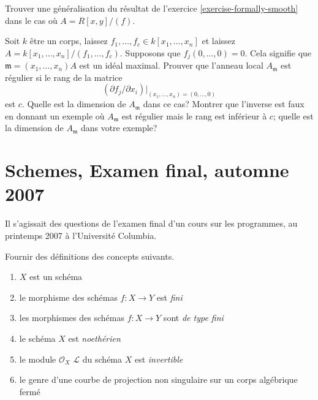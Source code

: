 \begin{exercise}
\label{exercise-formally-smooth-one-equation}
Trouver une généralisation du résultat de l'exercice \ref{exercise-formally-smooth} dans le cas
où $A = R[x, y]/(f)$.
\end{exercise}

\begin{exercise}
\label{exercise-Jacobian-criterion}
Soit $k$ être un corps, laissez $f_1, \ldots, f_c \in k[x_1, \ldots, x_n]$
et laissez $A = k[x_1, \ldots, x_n]/(f_1, \ldots, f_c)$.
Supposons que $f_j(0, \ldots, 0) = 0$. Cela signifie que
$\mathfrak m = (x_1, \ldots, x_n)A$ est un idéal maximal.
Prouver que l'anneau local $A_\mathfrak m$ est régulier si
le rang de la matrice
$$
(\partial f_j/ \partial x_i)|_{(x_1, \ldots, x_n) = (0, \ldots, 0)}
$$
est $c$. Quelle est la dimension de $A_\mathfrak m$ dans ce
cas? Montrer que l'inverse est faux en donnant un exemple où
$A_\mathfrak m$ est régulier mais le rang est inférieur à $c$;
quelle est la dimension de $A_\mathfrak m$ dans votre exemple?
\end{exercise}




\section{Schemes, Examen final, automne 2007}
\label{section-final-exam-fall-2007}

\noindent
Il s'agissait des questions de l'examen final d'un cours sur les
programmes, au printemps 2007 à l'Université Columbia.

\begin{exercise}[Definitions]
\label{exercise-definitions}
Fournir des définitions des concepts suivants.
\begin{enumerate}
\item $X$ est un schéma {\it}
\item le morphisme des schémas $f : X \to Y$ est {\it fini}
\item les morphismes des schémas $f : X \to Y$ sont {\it de type fini}
\item le schéma $X$ est {\it noethérien}
\item le module ${\mathcal O}_X$ ${\mathcal L}$ du
schéma $X$ est {\it invertible}
\item le genre {\it} d'une courbe
de projection non singulaire sur un corps algébrique fermé
\end{enumerate}
\end{exercise}

